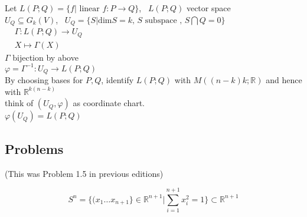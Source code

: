 Let $L(P;Q) = \lbrace f | \text{ linear } f : P \to Q \rbrace$, \, $L(P;Q)$ vector space \\
$U_Q \subseteq G_k(V)$, \, $U_Q = \lbrace S | \text{dim}S =k, \, S \text{ subspace }, \, S \bigcap Q = 0 \rbrace$ \\
$\begin{aligned}
  & \Gamma : L(P;Q) \to U_Q \\
  & X \mapsto \Gamma(X) \end{aligned}$ \\

$\Gamma$ bijection by above \\
$\varphi = \Gamma^{-1} : U_Q \to L(P;Q)$  \\

By choosing bases for $P,Q$, identify $L(P;Q)$ with $M((n-k)k; \mathbb{R})$ and hence with $\mathbb{R}^{k(n-k)}$ \\

think of $(U_Q, \varphi)$ as coordinate chart. \\
$\varphi(U_Q) = L(P;Q)$













\subsection*{Problems}

 (This was Problem 1.5 in previous editions)

\[
S^n = \lbrace ( x_1 \dots x_{n+1} \rbrace \in \mathbb{R}^{n+1} | \sum_{i=1}^{n+1} x_i^2 = 1 \rbrace \subset \mathbb{R}^{n+1}
\]

